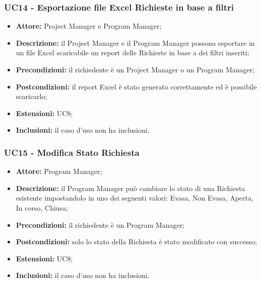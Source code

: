 \subsubsection*{UC14 - Esportazione file Excel Richieste in base a filtri}
\begin{itemize}[label=$\circ$]
\item \textbf{Attore:} Project Manager e Program Manager;
\item \textbf{Descrizione:} il Project Manager e il Program Manager possono esportare in un file Excel scaricabile un report delle Richieste in base a dei filtri inseriti;
\item \textbf{Precondizioni:} il richiedente è un Project Manager o un Program Manager;
\item \textbf{Postcondizioni:} il report Excel è stato generato correttamente ed è possibile scaricarlo;
\item \textbf{Estensioni:} UC8;
\item \textbf{Inclusioni:} il caso d'uso non ha inclusioni.
\end{itemize}

\subsubsection*{UC15 - Modifica Stato Richiesta}
\begin{itemize}[label=$\circ$]
\item \textbf{Attore:} Program Manager;
\item \textbf{Descrizione:} il Program Manager può cambiare lo stato di una Richiesta esistente impostandolo in uno dei seguenti valori: Evasa, Non Evasa, Aperta, In corso, Chiusa;
\item \textbf{Precondizioni:} il richiedente è un Program Manager;
\item \textbf{Postcondizioni:} solo lo stato della Richiesta è stato modificato con successo;
\item \textbf{Estensioni:} UC8;
\item \textbf{Inclusioni:} il caso d'uso non ha inclusioni.
\end{itemize}

